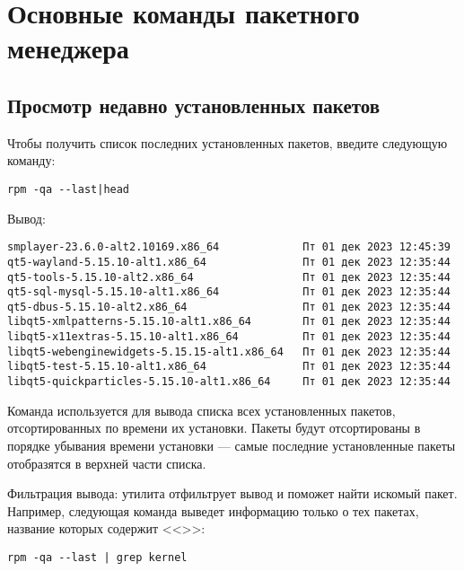 \chapter{Основные команды пакетного менеджера}\label{basic-package-manager-commands}
\section{Просмотр недавно установленных пакетов}\label{view-recently-installed-packages}
Чтобы получить список последних установленных пакетов, введите следующую команду: 

\begin{verbatim}
rpm -qa --last|head	
\end{verbatim}

Вывод:
\begin{verbatim}
smplayer-23.6.0-alt2.10169.x86_64             Пт 01 дек 2023 12:45:39
qt5-wayland-5.15.10-alt1.x86_64               Пт 01 дек 2023 12:35:44
qt5-tools-5.15.10-alt2.x86_64                 Пт 01 дек 2023 12:35:44
qt5-sql-mysql-5.15.10-alt1.x86_64             Пт 01 дек 2023 12:35:44
qt5-dbus-5.15.10-alt2.x86_64                  Пт 01 дек 2023 12:35:44
libqt5-xmlpatterns-5.15.10-alt1.x86_64        Пт 01 дек 2023 12:35:44
libqt5-x11extras-5.15.10-alt1.x86_64          Пт 01 дек 2023 12:35:44
libqt5-webenginewidgets-5.15.15-alt1.x86_64   Пт 01 дек 2023 12:35:44
libqt5-test-5.15.10-alt1.x86_64               Пт 01 дек 2023 12:35:44
libqt5-quickparticles-5.15.10-alt1.x86_64     Пт 01 дек 2023 12:35:44
\end{verbatim}

Команда  используется для вывода списка всех установленных пакетов, отсортированных 
по времени их установки. Пакеты будут отсортированы в порядке убывания времени установки --- самые 
последние установленные пакеты отобразятся в верхней части списка.

Фильтрация вывода: утилита  отфильтрует вывод и поможет найти искомый пакет. Например, 
следующая команда выведет информацию только о тех пакетах, название которых содержит <<>>:

\begin{verbatim}
rpm -qa --last | grep kernel
\end{verbatim} 
